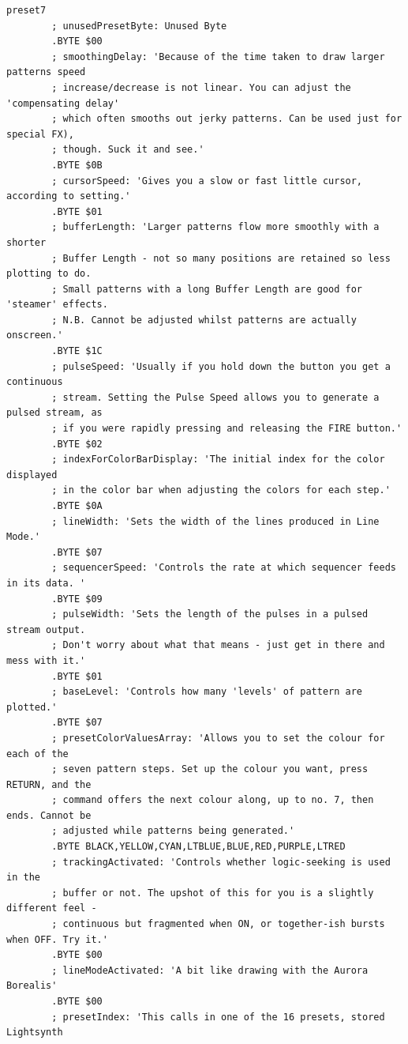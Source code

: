 \begin{lstlisting}[basicstyle=\tiny,caption=Source code for Preset 7.]
preset7
        ; unusedPresetByte: Unused Byte
        .BYTE $00
        ; smoothingDelay: 'Because of the time taken to draw larger patterns speed
        ; increase/decrease is not linear. You can adjust the 'compensating delay'
        ; which often smooths out jerky patterns. Can be used just for special FX),
        ; though. Suck it and see.'
        .BYTE $0B
        ; cursorSpeed: 'Gives you a slow or fast little cursor, according to setting.'
        .BYTE $01
        ; bufferLength: 'Larger patterns flow more smoothly with a shorter
        ; Buffer Length - not so many positions are retained so less plotting to do.
        ; Small patterns with a long Buffer Length are good for 'steamer' effects.
        ; N.B. Cannot be adjusted whilst patterns are actually onscreen.'
        .BYTE $1C
        ; pulseSpeed: 'Usually if you hold down the button you get a continuous
        ; stream. Setting the Pulse Speed allows you to generate a pulsed stream, as
        ; if you were rapidly pressing and releasing the FIRE button.'
        .BYTE $02
        ; indexForColorBarDisplay: 'The initial index for the color displayed
        ; in the color bar when adjusting the colors for each step.'
        .BYTE $0A
        ; lineWidth: 'Sets the width of the lines produced in Line Mode.'
        .BYTE $07
        ; sequencerSpeed: 'Controls the rate at which sequencer feeds in its data. '
        .BYTE $09
        ; pulseWidth: 'Sets the length of the pulses in a pulsed stream output.
        ; Don't worry about what that means - just get in there and mess with it.'
        .BYTE $01
        ; baseLevel: 'Controls how many 'levels' of pattern are plotted.'
        .BYTE $07
        ; presetColorValuesArray: 'Allows you to set the colour for each of the
        ; seven pattern steps. Set up the colour you want, press RETURN, and the
        ; command offers the next colour along, up to no. 7, then ends. Cannot be
        ; adjusted while patterns being generated.'
        .BYTE BLACK,YELLOW,CYAN,LTBLUE,BLUE,RED,PURPLE,LTRED
        ; trackingActivated: 'Controls whether logic-seeking is used in the
        ; buffer or not. The upshot of this for you is a slightly different feel -
        ; continuous but fragmented when ON, or together-ish bursts when OFF. Try it.'
        .BYTE $00
        ; lineModeActivated: 'A bit like drawing with the Aurora Borealis'
        .BYTE $00
        ; presetIndex: 'This calls in one of the 16 presets, stored Lightsynth

\end{lstlisting}
